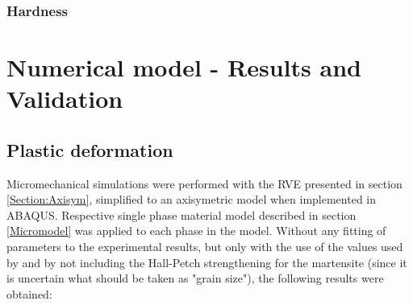 \documentclass{article}
\begin{document}
\subsubsection{Hardness}


\section{Numerical model - Results and Validation}
\subsection{Plastic deformation}
\label{Section:PlasticDeform}
Micromechanical simulations were performed with the RVE presented in section \ref{Section:Axisym}, simplified to an axisymetric model when implemented in ABAQUS. Respective single phase material model described in section \ref{Micromodel} was applied to each phase in the model. Without any fitting of parameters to the experimental results, but only with the use of the values used by \cite{Ramazani} and by not including the Hall-Petch strengthening for the martensite (since it is uncertain what should be taken as "grain size"), the following results were obtained:
\end{document}
